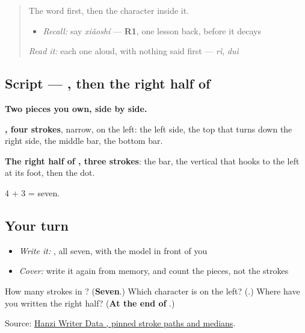 \label{lesson:ZH-W97-shi-time}



\begin{quote}
The word first, then the character inside it.

\begin{itemize}
\raggedright
  \item \emph{Recall:} say \emph{xiǎoshí} — \textbf{R1}, one lesson back, before it decays
\end{itemize}

\begin{quote}
 
\end{quote}

\emph{Read it:} each one aloud, with nothing said first — \emph{rì}, \emph{duì}
\end{quote}

\subsection*{Script — , then the right half of }

\begin{quote}
\end{quote}

\textbf{Two pieces you own, side by side.}

\textbf{, four strokes}, narrow, on the left: the left side, the top that turns down the right side, the middle bar, the bottom bar.

\textbf{The right half of , three strokes}: the bar, the vertical that hooks to the left at its foot, then the dot.

4 + 3 = seven.

\subsection*{Your turn}
\begin{itemize}
\raggedright
  \item \emph{Write it:} , all seven, with the model in front of you
  \item \emph{Cover:} write it again from memory, and count the pieces, not the strokes
\end{itemize}

\begin{tcolorbox}[breakable,colback=teal!4,colframe=teal!35!black,title={Before you move on}]
How many strokes in ? (\textbf{Seven}.) Which character is on the left? (\textbf{}.) Where have you written the right half? (\textbf{At the end of }.)

Source: \href{https://raw.githubusercontent.com/chanind/hanzi-writer-data/68d10a4b21150cae5e1ebbd223eed289cf32d90c/data/\%E6\%97\%B6.json}{Hanzi Writer Data , pinned stroke paths and medians}.
\end{tcolorbox}
